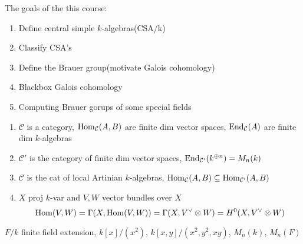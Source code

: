 \documentclass[a4paper,10pt]{article}
\begin{document}
The goals of the this course:
\begin{enumerate}
\item Define central simple $k$-algebras(CSA/k)
\item Classify CSA's
\item Define the Brauer group(motivate Galois cohomology)
\item Blackbox Galois cohomology
\item Computing Brauer gorups of some special fields
\end{enumerate}

\begin{example}
\begin{enumerate}
\item $\mathcal C$ is a category, $\operatorname{Hom}_{\mathcal C}(A,B)$ are finite dim vector spaces, $\operatorname{End}_{\mathcal C}(A)$ are finite dim $k$-algebras
\item $\mathcal C'$ is the category of finite dim vector spaces, $\operatorname{End}_{\mathcal C'}(k^{\oplus n})=M_n(k)$
\item $\mathcal C$ is the cat of local Artinian $k$-algebras, $\operatorname{Hom}_{\mathcal C}(A,B)\subseteq\operatorname{Hom}_{\mathcal C'}(A,B)$
\item $X$ proj $k$-var and $V,W$ vector bundles over $X$
\[
\operatorname{Hom}(V,W)=\Gamma(X,\operatorname{Hom}(V,W))=\Gamma(X,V^\vee\otimes W)=H^0(X,V^\vee\otimes W)
\]
\end{enumerate}
\end{example}

\begin{example}
$F/k$ finite field extension, $k[x]/(x^2)$, $k[x,y]/(x^2,y^2,xy)$, $M_n(k)$, $M_n(F)$
\end{example}
\end{document}

